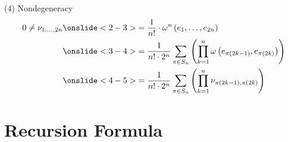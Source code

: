 \documentclass[compress]{beamer}
\begin{document}
\bgroup
{}
\begin{frame}{(4) Nondegeneracy}
  \begin{align*}
    0 \neq \nu_{1, \dots, 2n} & \onslide<2-3>{= \frac{1}{n!} \cdot \omega^{n} \left( e_1, \dots, e_{2n} \right)} \\ & \onslide<3-4>{= \frac{1}{n!\cdot2^n} \sum\limits_{\pi \in S_n} \left( \prod\limits_{k=1}^{n} \omega \left( e_{\pi \left(2k-1\right)}, e_{\pi \left(2k\right)} \right) \right)} \\
                              & \onslide<4-5>{= \frac{1}{n!\cdot2^n} \sum\limits_{\pi \in S_n} \left( \prod\limits_{k=1}^{n} \nu_{\pi \left(2k-1\right), \pi \left(2k\right)} \right)}
  \end{align*}
\end{frame}
\egroup

\blankframe{}

\section{Recursion Formula}
\end{document}
